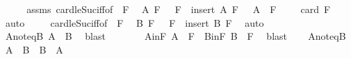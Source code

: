 \begin{isabellebody}
%
\isatagproof
{}\isamarkupfalse%
\ {\isacharminus}{\kern0pt}\isanewline
\ \ \isamarkupfalse%
\ assms\ card{\isacharunderscore}{\kern0pt}le{\isacharunderscore}{\kern0pt}Suc{\isacharunderscore}{\kern0pt}iff{\isacharbrackleft}{\kern0pt}of\ {}\ F{\isacharbrackright}{\kern0pt}\ \isamarkupfalse%
\ A\ F{\isacharprime}{\kern0pt}\ \ {}{\isacharcolon}{\kern0pt}\ {\isachardoublequoteopen}F\ {\isacharequal}{\kern0pt}\ insert\ A\ F{\isacharprime}{\kern0pt}{\isachardoublequoteclose}\ \ {}{\isacharcolon}{\kern0pt}\ {\isachardoublequoteopen}A\ {\isasymnotin}\ F{\isacharprime}{\kern0pt}{\isachardoublequoteclose}\ \ {}{\isacharcolon}{\kern0pt}\ {\isachardoublequoteopen}{}\ {\isasymle}\ card\ F{\isacharprime}{\kern0pt}{\isachardoublequoteclose}\ \isamarkupfalse%
\ auto\isanewline
\ \ \isamarkupfalse%
\ {}\ card{\isacharunderscore}{\kern0pt}le{\isacharunderscore}{\kern0pt}Suc{\isacharunderscore}{\kern0pt}iff{\isacharbrackleft}{\kern0pt}of\ {}\ F{\isacharprime}{\kern0pt}{\isacharbrackright}{\kern0pt}\ \isamarkupfalse%
\ B\ F{\isacharprime}{\kern0pt}{\isacharprime}{\kern0pt}\ \ {}{\isacharcolon}{\kern0pt}\ {\isachardoublequoteopen}F{\isacharprime}{\kern0pt}\ {\isacharequal}{\kern0pt}\ insert\ B\ F{\isacharprime}{\kern0pt}{\isacharprime}{\kern0pt}{\isachardoublequoteclose}\ \isamarkupfalse%
\ auto\isanewline
\ \ \isamarkupfalse%
\ {}\ {}\ \isamarkupfalse%
\ A{\isacharunderscore}{\kern0pt}noteq{\isacharunderscore}{\kern0pt}B{\isacharcolon}{\kern0pt}\ {\isachardoublequoteopen}A\ {\isasymnoteq}\ B{\isachardoublequoteclose}\ \isamarkupfalse%
\ blast\isanewline
\ \ \isamarkupfalse%
\ {}\ {}\ \isamarkupfalse%
\ A{\isacharunderscore}{\kern0pt}in{\isacharunderscore}{\kern0pt}F{\isacharcolon}{\kern0pt}\ {\isachardoublequoteopen}A\ {\isasymin}\ F{\isachardoublequoteclose}\ \ B{\isacharunderscore}{\kern0pt}in{\isacharunderscore}{\kern0pt}F{\isacharcolon}{\kern0pt}\ {\isachardoublequoteopen}B\ {\isasymin}\ F{\isachardoublequoteclose}\ \isamarkupfalse%
\ blast{\isacharplus}{\kern0pt}\isanewline
\ \ \isamarkupfalse%
\ A{\isacharunderscore}{\kern0pt}noteq{\isacharunderscore}{\kern0pt}B\ \isamarkupfalse%
\ {\isachardoublequoteopen}{\isacharparenleft}{\kern0pt}A\ {\isacharminus}{\kern0pt}\ B{\isacharparenright}{\kern0pt}\ {\isasymunion}\ {\isacharparenleft}{\kern0pt}B\ {\isacharminus}{\kern0pt}\ A{\isacharparenright}{\kern0pt}\ {\isasymnoteq}\ {\isacharbraceleft}{\kern0pt}{\isacharbraceright}{\kern0pt}{\isachardoublequoteclose}\ \isamarkupfalse%

\end{isabellebody}
